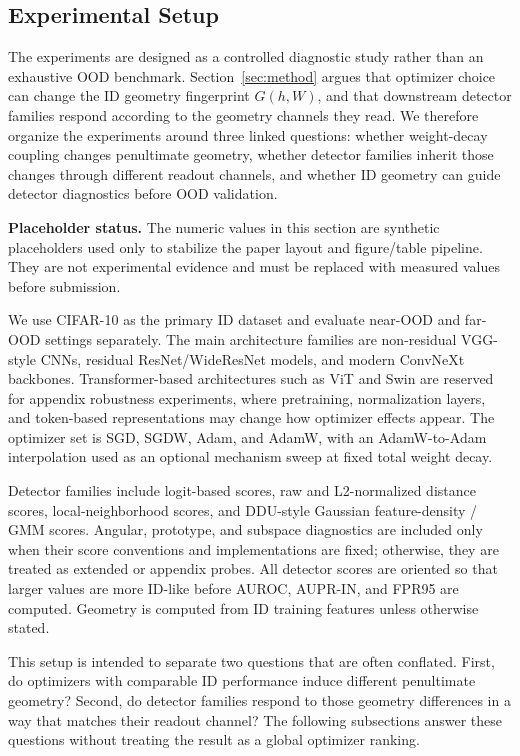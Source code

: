 \subsection{Experimental Setup}
\label{subsec:experimental-setup}

The experiments are designed as a controlled diagnostic study rather than an
exhaustive OOD benchmark. Section~\ref{sec:method} argues that optimizer choice
can change the ID geometry fingerprint \(G(h,W)\), and that downstream detector
families respond according to the geometry channels they read. We therefore
organize the experiments around three linked questions: whether weight-decay
coupling changes penultimate geometry, whether detector families inherit those
changes through different readout channels, and whether ID geometry can guide
detector diagnostics before OOD validation.

\textbf{Placeholder status.}
The numeric values in this section are synthetic placeholders used only to
stabilize the paper layout and figure/table pipeline. They are not experimental
evidence and must be replaced with measured values before submission.

We use CIFAR-10 as the primary ID dataset and evaluate near-OOD and far-OOD
settings separately. The main architecture families are non-residual VGG-style
CNNs, residual ResNet/WideResNet models, and modern ConvNeXt backbones.
Transformer-based architectures such as ViT and Swin are reserved for appendix
robustness experiments, where pretraining, normalization layers, and token-based
representations may change how optimizer effects appear. The optimizer set is
SGD, SGDW, Adam, and AdamW, with an AdamW-to-Adam interpolation used as an
optional mechanism sweep at fixed total weight decay.

Detector families include logit-based scores, raw and L2-normalized distance
scores, local-neighborhood scores, and DDU-style Gaussian feature-density / GMM
scores. Angular, prototype, and subspace diagnostics are included only when
their score conventions and implementations are fixed; otherwise, they are
treated as extended or appendix probes. All detector scores are oriented so that
larger values are more ID-like before AUROC, AUPR-IN, and FPR95 are computed.
Geometry is computed from ID training features unless otherwise stated.



This setup is intended to separate two questions that are often conflated. First,
do optimizers with comparable ID performance induce different penultimate
geometry? Second, do detector families respond to those geometry differences in
a way that matches their readout channel? The following subsections answer these
questions without treating the result as a global optimizer ranking.


